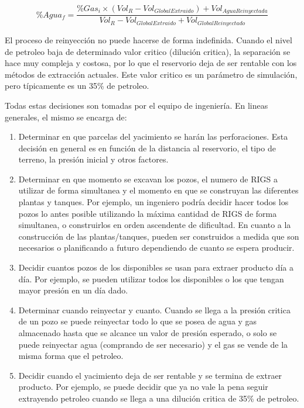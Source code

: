 \documentclass[10pt,a4paper]{article}
\begin{document}
\begin{equation}
\%Agua_f = \frac{\%Gas_i \times (Vol_R - Vol_{GlobalExtraido}) + Vol_{AguaReinyectada}}{Vol_R - Vol_{GlobalExtraido} + Vol_{GlobalReinyectado}}
\end{equation}

\pagebreak

El proceso de reinyección no puede hacerse de forma indefinida. Cuando el nivel de petroleo baja de determinado valor critico (dilución critica), la separación se hace muy compleja y costosa, por lo que el reservorio deja de ser rentable con los métodos de extracción actuales. Este valor critico es un parámetro de simulación, pero típicamente es un 35\% de petroleo.

Todas estas decisiones son tomadas por el equipo de ingeniería. En lineas generales, el mismo se encarga de:

\begin{enumerate}
\item Determinar en que parcelas del yacimiento se harán las perforaciones. Esta decisión en general es en función de la distancia al reservorio, el tipo de terreno, la presión inicial y otros factores.
\item Determinar en que momento se excavan los pozos, el numero de RIGS a utilizar de forma simultanea y el momento en que se construyan las diferentes plantas y tanques. Por ejemplo, un ingeniero podría decidir hacer todos los pozos lo antes posible utilizando la máxima cantidad de RIGS de forma simultanea, o construirlos en orden ascendente de dificultad. En cuanto a la construcción de las plantas/tanques, pueden ser construidos a medida que son necesarios o planificando a futuro dependiendo de cuanto se espera producir.
\item Decidir cuantos pozos de los disponibles se usan para extraer producto día a día. Por ejemplo, se pueden utilizar todos los disponibles o los que tengan mayor presión en un día dado.
\item Determinar cuando reinyectar y cuanto. Cuando se llega a la presión critica de un pozo se puede reinyectar todo lo que se posea de agua y gas almacenado hasta que se alcance un valor de presión esperado, o solo se puede reinyectar agua (comprando de ser necesario) y el gas se vende de la misma forma que el petroleo.
\item Decidir cuando el yacimiento deja de ser rentable y se termina de extraer producto. Por ejemplo, se puede decidir que ya no vale la pena seguir extrayendo petroleo cuando se llega a una dilución critica de 35\% de petroleo. 
\end{enumerate}
\end{document}
